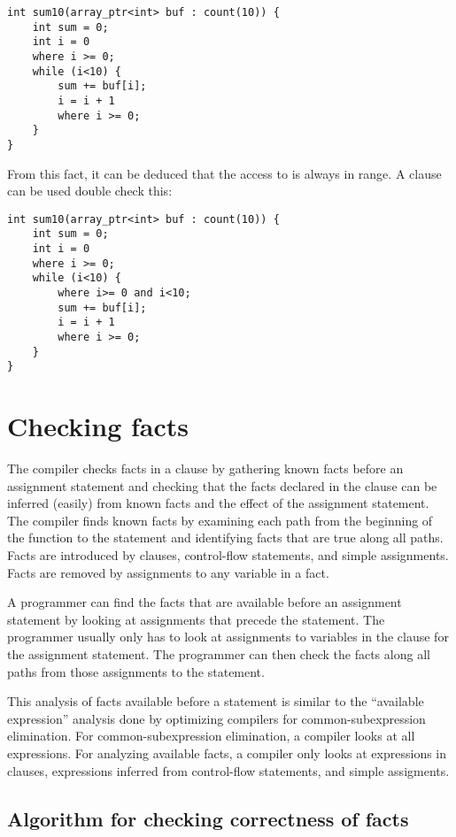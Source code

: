 \begin{lstlisting}
int sum10(array_ptr<int> buf : count(10)) {
    int sum = 0;
    int i = 0
    where i >= 0;
    while (i<10) {
        sum += buf[i];
        i = i + 1
        where i >= 0;
    }
}
\end{lstlisting}

From this fact, it can be deduced that the access to  is always in
range. A  clause can be used double check this:

\begin{lstlisting}
int sum10(array_ptr<int> buf : count(10)) {
    int sum = 0;
    int i = 0
    where i >= 0;
    while (i<10) {
        where i>= 0 and i<10;
        sum += buf[i];
        i = i + 1
        where i >= 0;
    }
}
\end{lstlisting}

\section{Checking facts}

The compiler checks facts in a  clause by gathering known
facts before an assignment statement and checking that the facts
declared in the  clause can be inferred (easily) from
known facts and the effect of the assignment statement. The compiler
finds known facts by examining each path from the beginning of the
function to the statement and identifying facts that are true along all
paths. Facts are introduced by  clauses, control-flow
statements, and simple assignments. Facts are removed by assignments to any
variable in a fact.

A programmer can find the facts that are available before an assignment
statement by looking at assignments that precede the statement. The
programmer usually only has to look at assignments to variables in the
 clause for the assignment statement. The programmer can then check
the facts along all paths from those assignments to the statement.

This analysis of facts available before a statement is similar to the
``available expression'' analysis done by optimizing compilers for
common-subexpression elimination. For common-subexpression elimination,
a compiler looks at all expressions. For analyzing available facts, a
compiler only looks at expressions in  clauses, expressions
inferred from control-flow statements, and simple assigments.

\subsection{Algorithm for checking correctness of facts}

